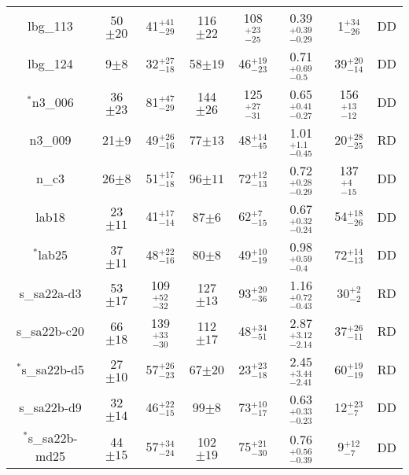 \documentclass[fleqn,usenatbib]{mn2e}
\begin{document}
\begin{table*}
\begin{threeparttable}
\begin{tabular}{cccccccc}
lbg\_113        & 50$\pm20$           & 41$^{+41}_{-29}$                     & 116$\pm22$                 & 108$^{+23}_{-25}$                  & 0.39$^{+0.39}_{-0.29}$                & 1$^{+34}_{-26}$  & DD   \\
lbg\_124         & 9$\pm8$                    & 32$^{+27}_{-18}$                    & 58$\pm19$                 & 46$^{+19}_{-23}$       & 0.71$^{+0.69}_{-0.5}$               & 39$^{+20}_{-14}$ & DD \\
$^{*}$n3\_006         & 36$\pm23$                    & 81$^{+47}_{-29}$                     & 144$\pm26$                 & 125$^{+27}_{-31}$          & 0.65$^{+0.41}_{-0.27}$                & 156$^{+13}_{-12}$ & DD   \\
n3\_009         & 21$\pm9$                    & 49$^{+26}_{-16}$                     & 77$\pm13$                  & 48$^{+14}_{-45}$          & 1.01$^{+1.1}_{-0.45}$                & 20$^{+28}_{-25}$  & RD   \\
n\_c3           & 26$\pm8$                    & 51$^{+17}_{-18}$                     & 96$\pm11$                  & 72$^{+12}_{-13}$          & 0.72$^{+0.28}_{-0.29}$                & 137$^{+4}_{-15}$  & DD  \\
lab18           & 23$\pm11$                   & 41$^{+17}_{-14}$                     & 87$\pm6$                  & 62$^{+7}_{-15}$           & 0.67$^{+0.32}_{-0.24}$                 & 54$^{+18}_{-26}$ & DD    \\
$^{*}$lab25           & 37$\pm11$                    & 48$^{+22}_{-16}$                     & 80$\pm8$                  & 49$^{+10}_{-19}$          & 0.98$^{+0.59}_{-0.4}$                & 72$^{+14}_{-13}$ & DD   \\
s\_sa22a-d3     & 53$\pm17$                    & 109$^{+52}_{-32}$                    & 127$\pm13$                 & 93$^{+20}_{-36}$          & 1.16$^{+0.72}_{-0.43}$               & 30$^{+2}_{-2}$ & RD    \\
s\_sa22b-c20    & 66$\pm18$                    & 139$^{+33}_{-30}$                    & 112$\pm17$                 & 48$^{+34}_{-51}$          & 2.87$^{+3.12}_{-2.14}$                & 37$^{+26}_{-11}$ & RD   \\
$^{*}$s\_sa22b-d5     & 27$\pm10$                    & 57$^{+26}_{-23}$                     & 67$\pm20$                  & 23$^{+23}_{-18}$          & 2.45$^{+3.44}_{-2.41}$               & 60$^{+19}_{-19}$ & RD   \\
s\_sa22b-d9     & 32$\pm14$                    & 46$^{+22}_{-15}$                     & 99$\pm8$                  & 73$^{+10}_{-17}$             & 0.63$^{+0.33}_{-0.23}$                 & 12$^{+23}_{-7}$ & DD   \\
$^{*}$s\_sa22b-md25   & 44$\pm15$           & 57$^{+34}_{-24}$                     & 102$\pm19$   & 75$^{+21}_{-30}$                   & 0.76$^{+0.56}_{-0.39}$                & 9$^{+12}_{-7}$ & DD


\end{tabular}
\end{threeparttable}
\end{table*}
\end{document}
